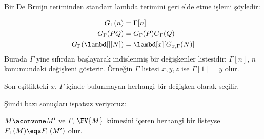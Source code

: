 \documentclass[../../../include/open-logic-section]{subfiles}
\begin{document}
Bir De Bruijn teriminden standart lambda terimini geri elde etme işlemi
şöyledir:

\begin{defn}
  \begin{align*}
    G_\Gamma(n) &= \Gamma[n] \\
    G_\Gamma(PQ) &= G_\Gamma(P) G_\Gamma(Q) \\
    G_\Gamma(\lambd[][N]) &= \lambd[x][G_{x,\Gamma}(N)]
  \end{align*}
  Burada $\Gamma$ yine sıfırdan başlayarak indislenmiş bir değişkenler
  listesidir; $\Gamma[n]$, $n$ konumundaki değişkeni gösterir. Örneğin
  $\Gamma$ listesi $x,y,z$ ise $\Gamma[1]=y$ olur.

  Son eşitlikteki $x$, $\Gamma$ içinde bulunmayan herhangi bir değişken olarak
  seçilir.
\end{defn}

Şimdi bazı sonuçları ispatsız veriyoruz:

\begin{prop}
  $M \aconvone M'$ ve $\Gamma$, $\FV{M}$ kümesini içeren herhangi bir
  listeyse $F_\Gamma(M) \eqs F_\Gamma(M')$ olur.
\end{prop}
\end{document}
